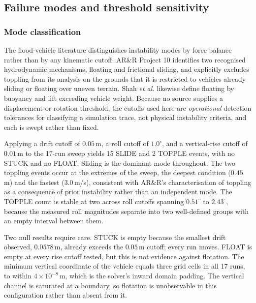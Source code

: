 
\subsection{Failure modes and threshold sensitivity}

\subsubsection{Mode classification}
The flood-vehicle literature distinguishes instability modes by force balance rather
than by any kinematic cutoff. AR\&R Project 10 identifies two recognised hydrodynamic
mechanisms, floating and frictional sliding, and explicitly excludes toppling from
its analysis on the grounds that it is restricted to vehicles already sliding or
floating over uneven terrain. Shah \emph{et al.} likewise define floating by buoyancy
and lift exceeding vehicle weight. Because no source supplies a displacement or
rotation threshold, the cutoffs used here are \emph{operational} detection tolerances
for classifying a simulation trace, not physical instability criteria, and each is
swept rather than fixed.

Applying a drift cutoff of $0.05$\,m, a roll cutoff of $1.0^\circ$, and a vertical-rise
cutoff of $0.01$\,m to the 17-run sweep yields 15 SLIDE and 2 TOPPLE events, with no
STUCK and no FLOAT. Sliding is the dominant mode throughout. The two toppling events
occur at the extremes of the sweep, the deepest condition ($0.45$\,m) and the fastest
($3.0$\,m/s), consistent with AR\&R's characterisation of toppling as a consequence of
prior instability rather than an independent mode. The TOPPLE count is stable at two
across roll cutoffs spanning $0.51^\circ$ to $2.43^\circ$, because the measured roll
magnitudes separate into two well-defined groups with an empty interval between them.

Two null results require care. STUCK is empty because the smallest drift observed,
$0.0578$\,m, already exceeds the $0.05$\,m cutoff; every run moves. FLOAT is empty at
every rise cutoff tested, but this is not evidence against flotation. The minimum
vertical coordinate of the vehicle equals three grid cells in all 17 runs, to within
$4\times10^{-8}$\,m, which is the solver's inward domain padding. The vertical channel
is saturated at a boundary, so flotation is unobservable in this configuration rather
than absent from it.

